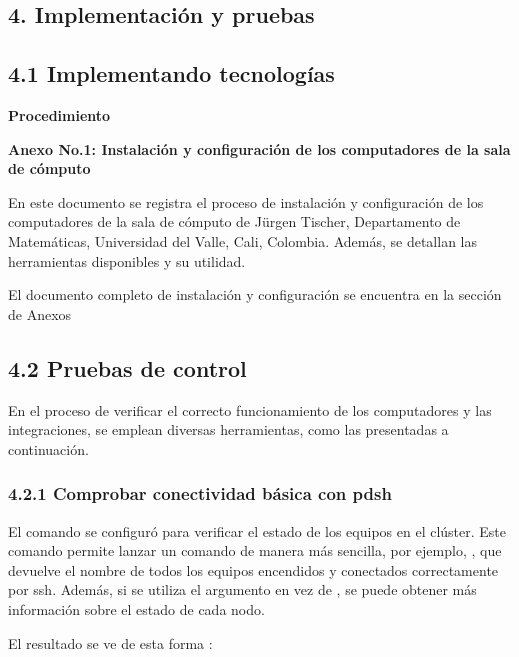 \begin{spacing}{1.5}
  \begin{tightcenter}
    \section{4. Implementación y pruebas}
    \mylinespacing
  \end{tightcenter}

  \subsection{4.1 Implementando tecnologías}

  \textbf{Procedimiento}

  \textbf{Anexo No.1: Instalación y configuración de los computadores de la
    sala
    de cómputo}

  En este documento se registra el proceso de instalación y configuración de
  los
  computadores de la sala de cómputo de Jürgen Tischer, Departamento de
  Matemáticas, Universidad del Valle, Cali, Colombia. Además, se detallan las
  herramientas disponibles y su utilidad.

  El documento completo de instalación y configuración se encuentra en la
  sección
  de Anexos

  \subsection{4.2 Pruebas de control}

  En el proceso de verificar el correcto funcionamiento de los computadores y las integraciones, se emplean diversas herramientas, como las presentadas a continuación.

  \subsubsection {4.2.1 Comprobar conectividad básica con pdsh}

  El comando  se configuró para verificar el estado de los equipos
  en
  el clúster. Este comando permite lanzar un comando de manera más sencilla,
  por
  ejemplo, , que devuelve el nombre de
  todos los
  equipos encendidos y conectados correctamente por ssh. Además, si se utiliza
  el
  argumento  en vez de , se puede obtener más
  información sobre el estado de cada nodo.

  El resultado se ve de esta forma :


\end{spacing}
